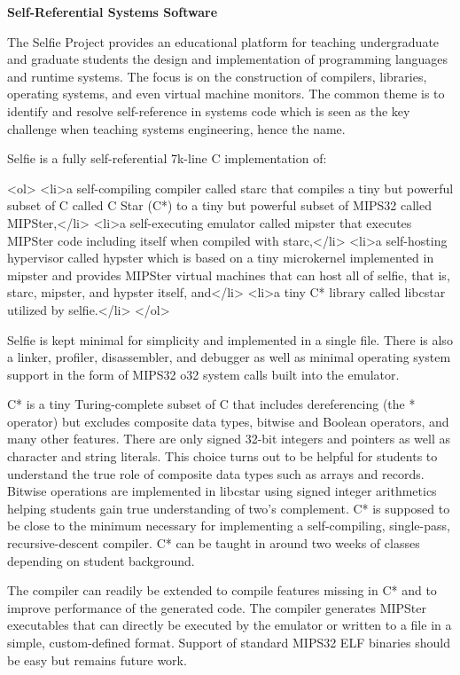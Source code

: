 {\bf{Self-Referential Systems Software}}

The Selfie Project provides an educational platform for teaching undergraduate and graduate students the design and implementation of programming languages and runtime systems. The focus is on the construction of compilers, libraries, operating systems, and even virtual machine monitors. The common theme is to identify and resolve self-reference in systems code which is seen as the key challenge when teaching systems engineering, hence the name.

Selfie is a fully self-referential 7k-line C implementation of:

<ol>
<li>a self-compiling compiler called starc that compiles a tiny but powerful subset of C called C Star (C*) to a tiny but powerful subset of MIPS32 called MIPSter,</li>
<li>a self-executing emulator called mipster that executes MIPSter code including itself when compiled with starc,</li>
<li>a self-hosting hypervisor called hypster which is based on a tiny microkernel implemented in mipster and provides MIPSter virtual machines that can host all of selfie, that is, starc, mipster, and hypster itself, and</li>
<li>a tiny C* library called libcstar utilized by selfie.</li>
</ol>

Selfie is kept minimal for simplicity and implemented in a single file. There is also a linker, profiler, disassembler, and debugger as well as minimal operating system support in the form of MIPS32 o32 system calls built into the emulator.

C* is a tiny Turing-complete subset of C that includes dereferencing (the * operator) but excludes composite data types, bitwise and Boolean operators, and many other features. There are only signed 32-bit integers and pointers as well as character and string literals. This choice turns out to be helpful for students to understand the true role of composite data types such as arrays and records. Bitwise operations are implemented in libcstar using signed integer arithmetics helping students gain true understanding of two's complement. C* is supposed to be close to the minimum necessary for implementing a self-compiling, single-pass, recursive-descent compiler. C* can be taught in around two weeks of classes depending on student background.

The compiler can readily be extended to compile features missing in C* and to improve performance of the generated code. The compiler generates MIPSter executables that can directly be executed by the emulator or written to a file in a simple, custom-defined format. Support of standard MIPS32 ELF binaries should be easy but remains future work.

